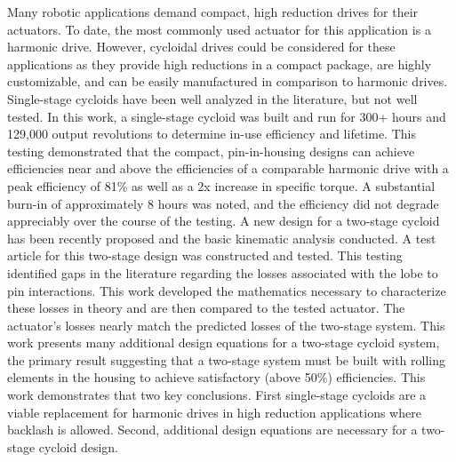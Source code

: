 
Many robotic applications demand compact, high reduction drives for their actuators. To date, the most commonly used actuator for this application is a harmonic drive. However, cycloidal drives could be considered for these applications as they provide high reductions in a compact package, are highly customizable, and can be easily manufactured in comparison to harmonic drives. Single-stage cycloids have been well analyzed in the literature, but not well tested. In this work, a single-stage cycloid was built and run for 300+ hours and 129,000 output revolutions to determine in-use efficiency and lifetime. This testing demonstrated that the compact, pin-in-housing designs can achieve efficiencies near and above the efficiencies of a comparable harmonic drive with a peak efficiency of 81\% as well as a 2x increase in specific torque. A substantial burn-in of approximately 8 hours was noted, and the efficiency did not degrade appreciably over the course of the testing. A new design for a two-stage cycloid has been recently proposed and the basic kinematic analysis conducted. A test article for this two-stage design was constructed and tested. This testing identified gaps in the literature regarding the losses associated with the lobe to pin interactions. This work developed the mathematics necessary to characterize these losses in theory and are then compared to the tested actuator. The actuator's losses nearly match the predicted losses of the two-stage system. This work presents many additional design equations for a two-stage cycloid system, the primary result suggesting that a two-stage system must be built with rolling elements in the housing to achieve satisfactory (above 50\%) efficiencies. This work demonstrates that two key conclusions. First single-stage cycloids are a viable replacement for harmonic drives in high reduction applications where backlash is allowed. Second, additional design equations are necessary for a two-stage cycloid design.